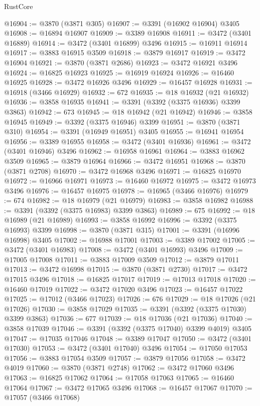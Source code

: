 \begin{lexlean}{RustCore}
\begin{coremodule}
@16904 := @3870 (@3871 @305)
@16907 := @3391 (@16902 @16904) @3405
@16908 := @16894 @16907
@16909 := @3389 @16908
@16911 := @3472 (@3401 @16889)
@16914 := @3472 (@3401 @16899) @3496
@16915 := @16911 @16914
@16917 := @3883 @16915 @3509
@16918 := @3879 @16917
@16919 := @3472 @16904
@16921 := @3870 (@3871 @2686)
@16923 := @3472 @16921 @3496
@16924 := @16825 @16923
@16925 := @16919 @16924
@16926 := @16460 @16925
@16928 := @3472 @16926 @3496
@16929 := @16457 @16928
@16931 := @16918 (@3466 @16929)
@16932 := 672
@16935 := @18 @16932 (@21 @16932)
@16936 := @3858 @16935
@16941 := @3391 (@3392 (@3375 @16936) @3399 @3863)
@16942 := 673
@16945 := @18 @16942 (@21 @16942)
@16946 := @3858 @16945
@16949 := @3392 (@3375 @16946) @3399
@16951 := @3870 (@3871 @310)
@16954 := @3391 (@16949 @16951) @3405
@16955 := @16941 @16954
@16956 := @3389 @16955
@16958 := @3472 (@3401 @16936)
@16961 := @3472 (@3401 @16946) @3496
@16962 := @16958 @16961
@16964 := @3883 @16962 @3509
@16965 := @3879 @16964
@16966 := @3472 @16951
@16968 := @3870 (@3871 @2708)
@16970 := @3472 @16968 @3496
@16971 := @16825 @16970
@16972 := @16966 @16971
@16973 := @16460 @16972
@16975 := @3472 @16973 @3496
@16976 := @16457 @16975
@16978 := @16965 (@3466 @16976)
@16979 := 674
@16982 := @18 @16979 (@21 @16979)
@16983 := @3858 @16982
@16988 := @3391 (@3392 (@3375 @16983) @3399 @3863)
@16989 := 675
@16992 := @18 @16989 (@21 @16989)
@16993 := @3858 @16992
@16996 := @3392 (@3375 @16993) @3399
@16998 := @3870 (@3871 @315)
@17001 := @3391 (@16996 @16998) @3405
@17002 := @16988 @17001
@17003 := @3389 @17002
@17005 := @3472 (@3401 @16983)
@17008 := @3472 (@3401 @16993) @3496
@17009 := @17005 @17008
@17011 := @3883 @17009 @3509
@17012 := @3879 @17011
@17013 := @3472 @16998
@17015 := @3870 (@3871 @2730)
@17017 := @3472 @17015 @3496
@17018 := @16825 @17017
@17019 := @17013 @17018
@17020 := @16460 @17019
@17022 := @3472 @17020 @3496
@17023 := @16457 @17022
@17025 := @17012 (@3466 @17023)
@17026 := 676
@17029 := @18 @17026 (@21 @17026)
@17030 := @3858 @17029
@17035 := @3391 (@3392 (@3375 @17030) @3399 @3863)
@17036 := 677
@17039 := @18 @17036 (@21 @17036)
@17040 := @3858 @17039
@17046 := @3391 (@3392 (@3375 @17040) @3399 @4019) @3405
@17047 := @17035 @17046
@17048 := @3389 @17047
@17050 := @3472 (@3401 @17030)
@17053 := @3472 (@3401 @17040) @3496
@17054 := @17050 @17053
@17056 := @3883 @17054 @3509
@17057 := @3879 @17056
@17058 := @3472 @4019
@17060 := @3870 (@3871 @2748)
@17062 := @3472 @17060 @3496
@17063 := @16825 @17062
@17064 := @17058 @17063
@17065 := @16460 @17064
@17067 := @3472 @17065 @3496
@17068 := @16457 @17067
@17070 := @17057 (@3466 @17068)

\end{coremodule}
\end{lexlean}

